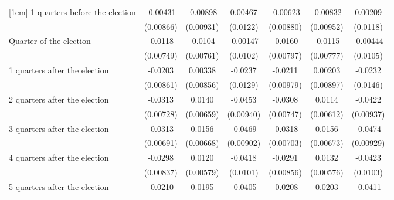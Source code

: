 \begin{table}[htbp]
\begin{tabular}{l*{6}{c}}
[1em]
 1 quarters before the election&    -0.00431         &    -0.00898         &     0.00467         &    -0.00623         &    -0.00832         &     0.00209         \\
                    &   (0.00866)         &   (0.00931)         &    (0.0122)         &   (0.00880)         &   (0.00952)         &    (0.0118)         \\
[1em]
Quarter of the election&     -0.0118         &     -0.0104         &    -0.00147         &     -0.0160\sym{*}  &     -0.0115         &    -0.00444         \\
                    &   (0.00749)         &   (0.00761)         &    (0.0102)         &   (0.00797)         &   (0.00777)         &    (0.0105)         \\
[1em]
 1 quarters after the election&     -0.0203\sym{*}  &     0.00338         &     -0.0237         &     -0.0211\sym{*}  &     0.00203         &     -0.0232         \\
                    &   (0.00861)         &   (0.00856)         &    (0.0129)         &   (0.00979)         &   (0.00897)         &    (0.0146)         \\
[1em]
 2 quarters after the election&     -0.0313\sym{***}&      0.0140\sym{*}  &     -0.0453\sym{***}&     -0.0308\sym{***}&      0.0114         &     -0.0422\sym{***}\\
                    &   (0.00728)         &   (0.00659)         &   (0.00940)         &   (0.00747)         &   (0.00612)         &   (0.00937)         \\
[1em]
 3 quarters after the election&     -0.0313\sym{***}&      0.0156\sym{*}  &     -0.0469\sym{***}&     -0.0318\sym{***}&      0.0156\sym{*}  &     -0.0474\sym{***}\\
                    &   (0.00691)         &   (0.00668)         &   (0.00902)         &   (0.00703)         &   (0.00673)         &   (0.00929)         \\
[1em]
 4 quarters after the election&     -0.0298\sym{***}&      0.0120\sym{*}  &     -0.0418\sym{***}&     -0.0291\sym{***}&      0.0132\sym{*}  &     -0.0423\sym{***}\\
                    &   (0.00837)         &   (0.00579)         &    (0.0101)         &   (0.00856)         &   (0.00576)         &    (0.0103)         \\
[1em]
 5 quarters after the election&     -0.0210\sym{**} &      0.0195         &     -0.0405\sym{**} &     -0.0208\sym{**} &      0.0203\sym{*}  &     -0.0411\sym{**} \\

\end{tabular}
\end{table}
